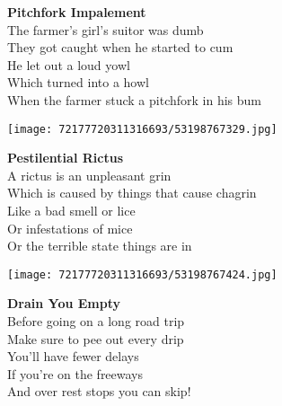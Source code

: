 \documentclass[10pt,letterpaper]{article}
\begin{document}
\begin{center}
\textbf{Pitchfork Impalement}\\
\vskip 0.2in
The farmer's girl's suitor was dumb\\
They got caught when he started to cum\\
He let out a loud yowl\\
Which turned into a howl\\
When the farmer stuck a pitchfork in his bum\\
\end{center}
\pagebreak

\begin{center}
\texttt{[image: 72177720311316693/53198767329.jpg]}
\end{center}

\begin{center}
\textbf{Pestilential Rictus}\\
\vskip 0.2in
A rictus is an unpleasant grin\\
Which is caused by things that cause chagrin\\
Like a bad smell or lice\\
Or infestations of mice\\
Or the terrible state things are in\\
\end{center}
\pagebreak

\begin{center}
\texttt{[image: 72177720311316693/53198767424.jpg]}
\end{center}

\begin{center}
\textbf{Drain You Empty}\\
\vskip 0.2in
Before going on a long road trip\\
Make sure to pee out every drip\\
You'll have fewer delays\\
If you're on the freeways\\
And over rest stops you can skip!\\
\end{center}
\pagebreak
\end{document}
